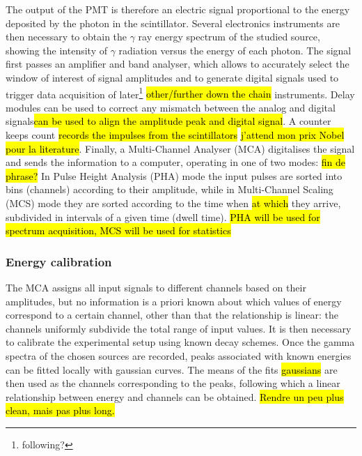 The output of the PMT is therefore an electric signal proportional to the energy deposited by the photon in the scintillator.
Several electronics instruments are then necessary to obtain the $\gamma$ ray energy spectrum of the studied source, 
showing the intensity of $\gamma$ radiation versus the energy of each photon.
The signal first passes an amplifier and band analyser, which allows to accurately select the window of interest of signal amplitudes and to generate digital signals used to trigger data acquisition of later\footnote{following?} \hl{other/further down the chain} instruments.
Delay modules can be used to correct any mismatch between the analog and digital signals\footnotemark \hl{can be used to align the amplitude peak and digital signal}.
A counter keeps count \hl{records the impulses from the scintillators} \hl{j'attend mon prix Nobel pour la literature}.
Finally, a Multi-Channel Analyser (MCA) digitalises the signal and sends the information to a computer, operating in one of two modes: \hl{fin de phrase?}
In Pulse Height Analysis (PHA) mode the input pulses are
sorted into bins (channels) according to their amplitude, while in Multi-Channel Scaling (MCS) mode they are sorted according to the time when \hl{at which} they arrive, subdivided in intervals of a given time (dwell time).
\hl{PHA will be used for spectrum acquisition, MCS will be used for statistics}


\subsubsection{Energy calibration}
\label{sec:energy_calibration}

The MCA assigns all input signals to different channels based on their amplitudes, 
but no information is a priori known about which values of energy correspond to a certain channel,
other than that the relationship is linear: 
the channels uniformly subdivide the total range of input values.
It is then necessary to calibrate the experimental setup using known decay schemes.
Once the gamma spectra of the chosen sources are recorded, peaks associated with known energies can be fitted locally with gaussian curves.
The means of the fits \hl{gaussians} are then used as the channels corresponding to the peaks, following which a linear relationship between energy and channels can be obtained. \hl{Rendre un peu plus clean, mais pas plus long.}

